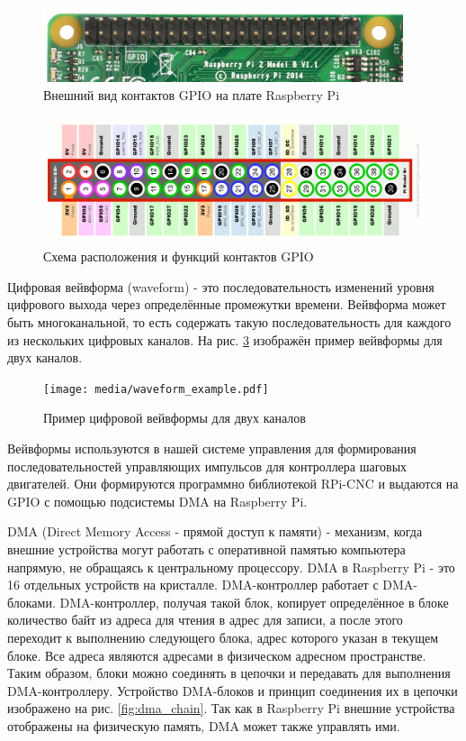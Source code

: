 \documentclass[14pt,russian,a4paper]{extarticle}
\newcounter{subsubsubsection}[subsubsection]
\begin{document}
\begin{figure}[h!]
    \centerline{\includegraphics[width=300pt]{media/gpio_pins.jpg}}
    \caption{Внешний вид контактов GPIO на плате Raspberry Pi}
    \label{fig:gpio_pins}
\end{figure}

\begin{figure}[h!]
    \centerline{\includegraphics[width=400pt]{media/gpio_pinout.png}}
    \caption{Схема расположения и функций контактов GPIO}
    \label{fig:gpio_pinout}
\end{figure}

Цифровая вейвформа (waveform) - это последовательность изменений уровня цифрового выхода через определённые промежутки времени. Вейвформа может быть многоканальной, то есть содержать такую последовательность для каждого из нескольких цифровых каналов. На рис. \ref{fig:waveform} изображён пример вейвформы для двух каналов.
\newline

\begin{figure}[h!]
    \centerline{\texttt{[image: media/waveform\_example.pdf]}}
    \caption{Пример цифровой вейвформы для двух каналов}
    \label{fig:waveform}
\end{figure}

Вейвформы используются в нашей системе управления для формирования последовательностей управляющих импульсов для контроллера шаговых двигателей. Они формируются программно библиотекой RPi-CNC и выдаются на GPIO с помощью подсистемы DMA на Raspberry Pi.

DMA (Direct Memory Access - прямой доступ к памяти) - механизм, когда внешние устройства могут работать с оперативной памятью компьютера напрямую, не обращаясь к центральному процессору. DMA в Raspberry Pi - это 16 отдельных устройств на кристалле. DMA-контроллер работает с DMA-блоками. DMA-контроллер, получая такой блок, копирует определённое в блоке количество байт из адреса для чтения в адрес для записи, а после этого переходит к выполнению следующего блока, адрес которого указан в текущем блоке. Все адреса являются адресами в физическом адресном пространстве. Таким образом, блоки можно соединять в цепочки и передавать для выполнения DMA-контроллеру. Устройство DMA-блоков и принцип соединения их в цепочки изображено на рис. \ref{fig:dma_chain}. Так как в Raspberry Pi внешние устройства отображены на физическую память, DMA может также управлять ими. 
\end{document}
